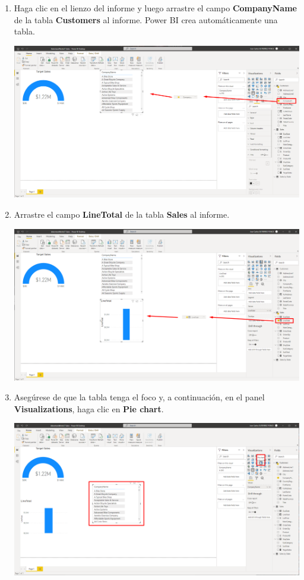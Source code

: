 \documentclass[12pt,letterpaper]{article}
\newcommand\tab[1][1cm]{\hspace*{#1}}
\begin{document}
\begin{enumerate}[\tab 1.]
\begin{center}
        \end{center}
        \item Haga clic en el lienzo del informe y luego arrastre el campo \textbf{CompanyName} de la tabla \textbf{Customers} al informe. Power BI crea automáticamente una tabla.
        \begin{center}
            \includegraphics[width=13cm]{./img/img83.png}
        \end{center}
        \item Arrastre el campo \textbf{LineTotal} de la tabla \textbf{Sales} al informe.
        \begin{center}
            \includegraphics[width=13cm]{./img/img84.png}
        \end{center}
        \item Asegúrese de que la tabla tenga el foco y, a continuación, en el panel \textbf{Visualizations}, haga clic en \textbf{Pie chart}.
        \begin{center}
            \includegraphics[width=13cm]{./img/img85.png}

\end{center}
\end{enumerate}
\end{document}
